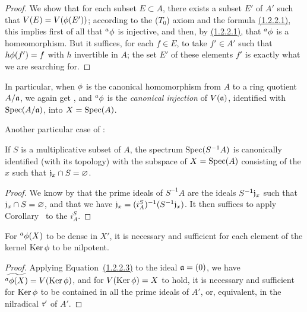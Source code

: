 \begin{proof}
\label{proof-1.1.2.4}
We show that for each subset $E\subset A$, there exists a subset $E'$ of $A'$ such that $V(E)=V(\phi(E'))$;
according to the ($T_0$) axiom  and the formula \hyperref[1.1.2.2]{(1.2.2.1)}, this implies first of all that ${}^a\phi$ is injective, and then, by \hyperref[1.1.2.2]{(1.2.2.1)}, that ${}^a\phi$ is a homeomorphism.
But it suffices, for each $f\in E$, to take $f'\in A'$ such that $h\phi(f')=f$ with $h$ invertible in $A$;
the set $E'$ of these elements $f'$ is exactly what we are searching for.
\end{proof}

\begin{env}[1.2.5]
\label{1.1.2.5}
In particular, when $\phi$ is the canonical homomorphism from $A$ to a ring quotient $A/\mathfrak{a}$, we again get , and ${}^a\phi$ is the \emph{canonical injection} of $V(\mathfrak{a})$, identified with ${\mathop{\mathrm{Spec}}\nolimits}(A/\mathfrak{a})$, into $X={\mathop{\mathrm{Spec}}\nolimits}(A)$.
\end{env}

Another particular case of :
\begin{cor}[1.2.6]
\label{1.1.2.6}
If $S$ is a multiplicative subset of $A$, the spectrum ${\mathop{\mathrm{Spec}}\nolimits}(S^{-1}A)$ is canonically identified (with its topology) with the subspace of $X={\mathop{\mathrm{Spec}}\nolimits}(A)$ consisting of the $x$ such that $\mathfrak{j}_x\cap S=\varnothing$.
\end{cor}

\begin{proof}
\label{proof-1.1.2.6}
We know by  that the prime ideals of $S^{-1}A$ are the ideals $S^{-1}\mathfrak{j}_x$ such that $\mathfrak{j}_x\cap S=\varnothing$, and that we have $\mathfrak{j}_x=(i_A^S)^{-1}(S^{-1}\mathfrak{j}_x)$.
It then suffices to apply Corollary~ to the $i_A^S$.
\end{proof}

\begin{cor}[1.2.7]
\label{1.1.2.7}
For ${}^a\phi(X)$ to be dense in $X'$, it is necessary and sufficient for each element of the kernel ${\mathop{\mathrm{Ker}}\nolimits}\,\phi$ to be nilpotent.
\end{cor}

\begin{proof}
\label{proof-1.1.2.7}
Applying Equation~\hyperref[1.1.2.2]{(1.2.2.3)} to the ideal $\mathfrak{a}=(0)$, we have ${\widetilde{{}^a\phi(X)}}=V({\mathop{\mathrm{Ker}}\nolimits}\,\phi)$, and for $V({\mathop{\mathrm{Ker}}\nolimits}\,\phi)=X$ to hold, it is necessary and sufficient for ${\mathop{\mathrm{Ker}}\nolimits}\,\phi$ to be contained in all the prime ideals of $A'$, or, equivalent, in the nilradical $\mathfrak{r}'$ of $A'$.
\end{proof}

